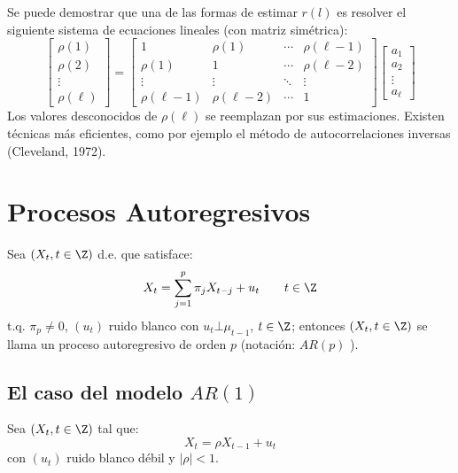 Se puede demostrar que una de las formas de estimar $r(l)$ es resolver el siguiente sistema de ecuaciones lineales (con matriz sim\'{e}trica):
\[
\begin{bmatrix}
	\rho (1)\\
	\rho (2)\\
	\vdots \\
	\rho (\ell)
\end{bmatrix}
=
\begin{bmatrix}
	1 & \rho(1) & \cdots & \rho (\ell-1)\\
	\rho(1) & 1 & \cdots & \rho (\ell-2)\\
	\vdots & \vdots &\ddots & \vdots \\
	\rho (\ell-1) & \rho (\ell-2) & \cdots & 1
\end{bmatrix}
\begin{bmatrix}
	a_{1}\\
	a_{2}\\
	\vdots \\
	a_{\ell}
\end{bmatrix}
\]
Los valores desconocidos de $\rho \left( \ell \right)$ se reemplazan por sus estimaciones. Existen t\'{e}cnicas m\'{a}s eficientes, como por ejemplo el m\'{e}todo de autocorrelaciones inversas (Cleveland, 1972).

\section{Procesos Autoregresivos}

\begin{definicion}
Sea $\left( {X_{t}, t\in \Z} \right)$ d.e. que satisface:
\[
X_{t} =\sum_{j=1}^p {\pi_{j} X_{t-j} +u_{t} } 
\qquad
t\in \Z
\]
t.q. $\pi_{p} \ne 0$, $\left( {u_{t} } \right)$ ruido blanco con $u_{t} \bot \mu_{t-1}$, $t\in \Z$; entonces $\left( {X_{t}, t\in \Z} \right)$ se llama un proceso autoregresivo de orden $p$ (notaci\'{o}n: $AR(p)$ ).
\end{definicion}


\subsection{El caso del modelo $AR(1)$}

Sea $\left(X_{t}, t\in \Z \right)$ tal que:
\begin{equation}
\label{eq2}
X_{t} =\rho X_{t-1} +u_{t} 
\end{equation}
con $\left( {u_{t} } \right)$ ruido blanco d\'{e}bil y $\left| \rho \right|<1$.\newline

